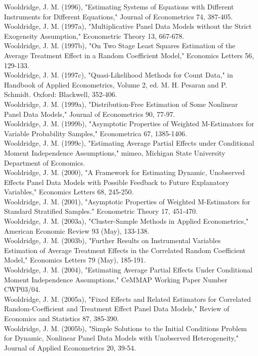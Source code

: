 \documentclass[10pt]{article}
\begin{document}
Wooldridge, J. M. (1996), "Estimating Systems of Equations with Different Instruments for Different Equations," Journal of Econometrics 74, 387-405.\\
Wooldridge, J. M. (1997a), "Multiplicative Panel Data Models without the Strict Exogeneity Assumption," Econometric Theory 13, 667-678.\\
Wooldridge, J. M. (1997b), "On Two Stage Least Squares Estimation of the Average Treatment Effect in a Random Coefficient Model," Economics Letters 56, 129-133.\\
Wooldridge, J. M. (1997c), "Quasi-Likelihood Methods for Count Data," in Handbook of Applied Econometrics, Volume 2, ed. M. H. Pesaran and P. Schmidt. Oxford: Blackwell, 352-406.\\
Wooldridge, J. M. (1999a), "Distribution-Free Estimation of Some Nonlinear Panel Data Models," Journal of Econometrics 90, 77-97.\\
Wooldridge, J. M. (1999b), "Asymptotic Properties of Weighted M-Estimators for Variable Probability Samples," Econometrica 67, 1385-1406.\\
Wooldridge, J. M. (1999c), "Estimating Average Partial Effects under Conditional Moment Independence Assumptions," mimeo, Michigan State University Department of Economics.\\
Wooldridge, J. M. (2000), "A Framework for Estimating Dynamic, Unobserved Effects Panel Data Models with Possible Feedback to Future Explanatory Variables," Economics Letters 68, 245-250.\\
Wooldridge, J. M. (2001), "Asymptotic Properties of Weighted M-Estimators for Standard Stratified Samples." Econometric Theory 17, 451-470.\\
Wooldridge, J. M. (2003a), "Cluster-Sample Methods in Applied Econometrics," American Economic Review 93 (May), 133-138.\\
Wooldridge, J. M. (2003b), "Further Results on Instrumental Variables Estimation of Average Treatment Effects in the Correlated Random Coefficient Model," Economics Letters 79 (May), 185-191.\\
Wooldridge, J. M. (2004), "Estimating Average Partial Effects Under Conditional Moment Independence Assumptions," CeMMAP Working Paper Number CWP03/04.\\
Wooldridge, J. M. (2005a), "Fixed Effects and Related Estimators for Correlated Random-Coefficient and Treatment Effect Panel Data Models," Review of Economics and Statistics 87, 385-390.\\
Wooldridge, J. M. (2005b), "Simple Solutions to the Initial Conditions Problem for Dynamic, Nonlinear Panel Data Models with Unobserved Heterogeneity," Journal of Applied Econometrics 20, 39-54.\\
\end{document}
